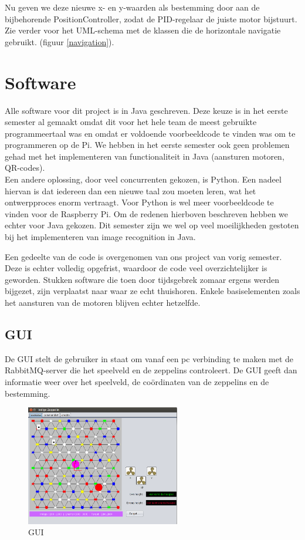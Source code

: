 \documentclass[eind]{penoverslag}
\begin{document}
Nu geven we deze nieuwe x- en y-waarden als bestemming door aan de bijbehorende PositionController, zodat de PID-regelaar de juiste motor bijstuurt. Zie verder voor het UML-schema met de klassen die de horizontale navigatie gebruikt. (figuur \ref{navigation}).

\section{Software}

Alle software voor dit project is in Java geschreven. Deze keuze is in het eerste semester al gemaakt omdat dit voor het hele team de meest gebruikte programmeertaal was en omdat er voldoende voorbeeldcode te vinden was om te programmeren op de Pi. We hebben in het eerste semester ook geen problemen gehad met het implementeren van functionaliteit in Java (aansturen motoren, QR-codes). \\
Een andere oplossing, door veel concurrenten gekozen, is Python. Een nadeel hiervan is dat iedereen dan een nieuwe taal zou moeten leren, wat het ontwerpproces enorm vertraagt. Voor Python is wel meer voorbeeldcode te vinden voor de Raspberry Pi. Om de redenen hierboven beschreven hebben we echter voor Java gekozen. Dit semester zijn we wel op veel moeilijkheden gestoten bij het implementeren van image recognition in Java.

Een gedeelte van de code is overgenomen van ons project van vorig semester. Deze is echter volledig opgefrist, waardoor de code veel overzichtelijker is geworden. Stukken software die toen door tijdsgebrek zomaar ergens werden bijgezet, zijn verplaatst naar waar ze echt thuishoren. Enkele basiselementen zoals het aansturen van de motoren blijven echter hetzelfde.

\subsection{GUI}
De GUI stelt de gebruiker in staat om vanaf een pc verbinding te maken met de RabbitMQ-server die het speelveld en de zeppelins controleert. De GUI geeft dan informatie weer over het speelveld, de co\"{o}rdinaten van de zeppelins en de bestemming. \\

\begin{figure}[H]
\begin{center}
\includegraphics[width=0.6\textwidth]{GUI.png}
\end{center}
\caption{GUI}
\label{GUI}
\end{figure}
\end{document}
